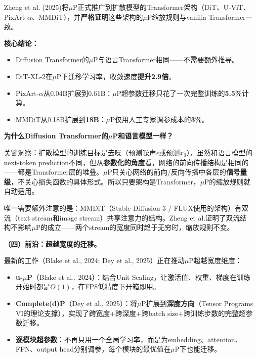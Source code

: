 \documentclass[11pt,a4paper]{article}
\begin{document}
\begin{tcolorbox}[colback=blue!5,colframe=blue!50!black,title=\textbf{关键论文：Scaling Diffusion Transformers Efficiently via $\mu$P}]
Zheng et al. (2025)将$\mu$P正式推广到扩散模型的Transformer架构（DiT、U-ViT、PixArt-$\alpha$、MMDiT），并\textbf{严格证明}这些架构的$\mu$P缩放规则与vanilla Transformer一致。

\textbf{核心结论：}
\begin{itemize}[leftmargin=*]
\item Diffusion Transformer的$\mu$P与语言Transformer相同——不需要额外推导。
\item DiT-XL-2在$\mu$P下迁移学习率，收敛速度\textbf{提升2.9倍}。
\item PixArt-$\alpha$从0.04B扩展到0.61B：$\mu$P超参数迁移只花了一次完整训练的\textbf{5.5\%}计算。
\item MMDiT从0.18B扩展到\textbf{18B}：$\mu$P仅用人工专家调参成本的\textbf{3\%}。
\end{itemize}

\textbf{为什么Diffusion Transformer的$\mu$P和语言模型一样？}

关键洞察：扩散模型的训练目标是去噪（预测噪声$\epsilon$或预测$x_0$），虽然和语言模型的next-token prediction不同，但从\textbf{参数化的角度}看，网络的前向传播结构是相同的——都是Transformer层的堆叠。$\mu$P只关心网络的前向/反向传播中各层的\textbf{信号量级}，不关心损失函数的具体形式。所以只要架构是Transformer，$\mu$P的缩放规则就自动适用。

唯一需要额外注意的是：MMDiT（Stable Diffusion 3 / FLUX使用的架构）有双流（text stream和image stream）共享注意力的结构。Zheng et al.证明了双流结构不影响$\mu$P的成立——两个stream的宽度同时趋于无穷时，缩放规则不变。
\end{tcolorbox}

\textbf{（四）前沿：超越宽度的迁移。}

最新的工作（Blake et al., 2024; Dey et al., 2025）正在推动$\mu$P超越宽度维度：
\begin{itemize}[leftmargin=*]
\item \textbf{u-$\mu$P}（Blake et al., 2024）：结合Unit Scaling，让激活值、权重、梯度在训练开始时都是$O(1)$，在FP8低精度下开箱即用。
\item \textbf{Complete(d)P}（Dey et al., 2025）：将$\mu$P扩展到\textbf{深度方向}（Tensor Programs VI的理论支撑），实现了跨宽度+跨深度+跨batch size+跨训练步数的完整超参数迁移。
\item \textbf{逐模块超参数}：不再只用一个全局学习率，而是为embedding、attention、FFN、output head分别调参，每个模块的最优值在$\mu$P下也能迁移。
\end{itemize}
\end{document}
